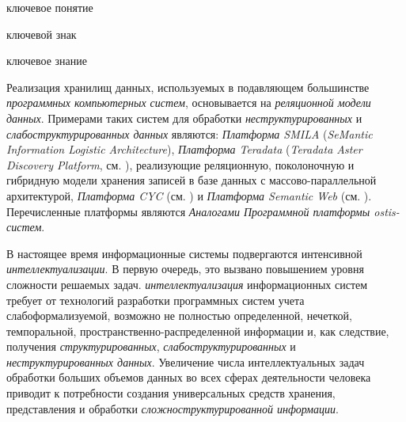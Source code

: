 \begin{SCn}

\begin{scnrelfromlist}{ключевое понятие}
\end{scnrelfromlist}

\begin{scnrelfromlist}{ключевой знак}
\end{scnrelfromlist}

\begin{scnrelfromlist}{ключевое знание}
\end{scnrelfromlist}

\end{SCn}

Реализация хранилищ данных, используемых в подавляющем большинстве \textit{программных компьютерных систем}, основывается на \textit{реляционной модели данных}. Примерами таких систем для обработки \textit{неструктурированных} и \textit{слабоструктурированных данных} являются: \textit{Платформа SMILA} (\textit{SeMantic Information Logistic Architecture}), \textit{Платформа Teradata} (\textit{Teradata Aster Discovery Platform}, см. ), реализующие реляционную, поколоночную и гибридную модели хранения записей в базе данных с массово-параллельной архитектурой, \textit{Платформа CYC} (см. ) и \textit{Платформа Semantic Web} (см. ). Перечисленные платформы являются \textit{Аналогами Программной платформы ostis-систем}.

В настоящее время информационные системы подвергаются интенсивной \textit{интеллектуализации}. В первую очередь, это вызвано повышением уровня сложности решаемых задач. \textit{интеллектуализация} информационных систем требует от технологий разработки программных систем учета слабоформализуемой, возможно не полностью определенной, нечеткой, темпоральной, пространственно-распределенной информации и, как следствие, получения \textit{структурированных}, \textit{слабоструктурированных} и \textit{неструктурированных данных}. Увеличение числа интеллектуальных задач обработки больших объемов данных во всех сферах деятельности человека приводит к потребности создания универсальных средств хранения, представления и обработки \textit{сложноструктурированной информации}.

